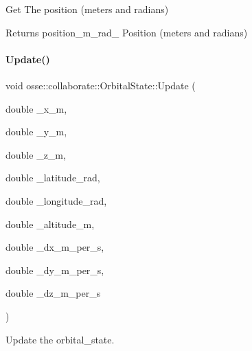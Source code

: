 Get The position (meters and radians) 

\begin{DoxyReturn}{Returns}
position\+\_\+m\+\_\+rad\+\_\+ Position (meters and radians) 
\end{DoxyReturn}
\mbox{\label{classosse_1_1collaborate_1_1_orbital_state_a29fea23801f7de2f5ad72888b15ca220}} 
\paragraph{\texorpdfstring{Update()}{Update()}}
{\footnotesize\ttfamily void osse\+::collaborate\+::\+Orbital\+State\+::\+Update (\begin{DoxyParamCaption}\item[{double}]{\+\_\+x\+\_\+m,  }\item[{double}]{\+\_\+y\+\_\+m,  }\item[{double}]{\+\_\+z\+\_\+m,  }\item[{double}]{\+\_\+latitude\+\_\+rad,  }\item[{double}]{\+\_\+longitude\+\_\+rad,  }\item[{double}]{\+\_\+altitude\+\_\+m,  }\item[{double}]{\+\_\+dx\+\_\+m\+\_\+per\+\_\+s,  }\item[{double}]{\+\_\+dy\+\_\+m\+\_\+per\+\_\+s,  }\item[{double}]{\+\_\+dz\+\_\+m\+\_\+per\+\_\+s }\end{DoxyParamCaption})}



Update the orbital\+\_\+state. 


